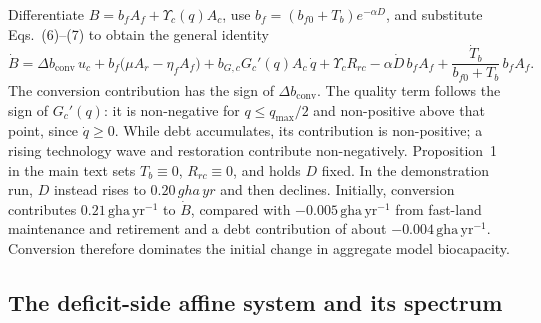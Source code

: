 \documentclass[11pt,a4paper]{article}
\newcommand{\dconv}{\Delta b_{\mathrm{conv}}}
\newcommand{\Ups}{\Upsilon_c}
\begin{document}
Differentiate $B=b_fA_f+\Ups(q)A_c$, use $b_f=(b_{f0}+T_b)e^{-\alpha D}$, and substitute Eqs.~(6)--(7) to obtain the general identity
\begin{equation}\label{eq:si_identity}
\dot B=\dconv\,u_c+b_f\big(\mu A_r-\eta_fA_f\big)+b_{G,c}G_c'(q)A_c\,\dot q+\Ups R_{rc}-\alpha\dot D\,b_fA_f+\frac{\dot T_b}{b_{f0}+T_b}\,b_fA_f .
\end{equation}
The conversion contribution has the sign of $\dconv$. The quality term follows the sign of $G_c'(q)$: it is non-negative for $q\le q_{\max}/2$ and non-positive above that point, since $\dot q\ge0$. While debt accumulates, its contribution is non-positive; a rising technology wave and restoration contribute non-negatively. Proposition~1 in the main text sets $T_b\equiv0$, $R_{rc}\equiv0$, and holds $D$ fixed. In the demonstration run, $D$ instead rises to $0.20\,gha\,yr$ and then declines. Initially, conversion contributes $0.21\,\mathrm{gha\,yr^{-1}}$ to $\dot B$, compared with $-0.005\,\mathrm{gha\,yr^{-1}}$ from fast-land maintenance and retirement and a debt contribution of about $-0.004\,\mathrm{gha\,yr^{-1}}$. Conversion therefore dominates the initial change in aggregate model biocapacity.

\newpage
\subsection{The deficit-side affine system and its spectrum}\label{si:affine}
\end{document}
